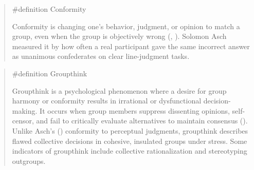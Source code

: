 \documentclass[
  letterpaper,
]{book}
\begin{document}
\begin{quote}
\label{def-conformity}{\#definition} Conformity

Conformity is changing one's behavior, judgment, or opinion to match a
group, even when the group is objectively wrong
(,
). Solomon Asch measured it by how
often a real participant gave the same incorrect answer as unanimous
confederates on clear line-judgment tasks.
\end{quote}

\begin{quote}
\label{def-groupthink}{\#definition} Groupthink

Groupthink is a psychological phenomenon where a desire for group
harmony or conformity results in irrational or dysfunctional
decision-making. It occurs when group members suppress dissenting
opinions, self-censor, and fail to critically evaluate alternatives to
maintain consensus ().
Unlike Asch's () conformity to
perceptual judgments, groupthink describes flawed collective decisions
in cohesive, insulated groups under stress. Some indicators of
groupthink include collective rationalization and stereotyping
outgroups.
\end{quote}
\end{document}
